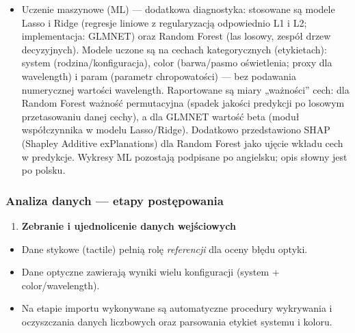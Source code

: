 \documentclass[
  10pt,
]{article}
\providecommand{\tightlist}{%
  \setlength{\itemsep}{0pt}\setlength{\parskip}{0pt}}
\begin{document}
\begin{itemize}
  nachylenie (p\textless0.05). \textbf{NIE} = nie ma żadnego systemu z
  istotnym nachyleniem (p\textless0.05) --- nawet jeśli miejscami
  widoczne są słabe „Trendy (p\textless0.1)''. Jest to wskaźnik
  przesiewowy (screening): „NIE'' nie dowodzi braku wpływu wavelength,
  tylko brak wykrytego trendu w danych; wskaźnik nie niesie też
  informacji o kierunku trendu (czy większa wavelength poprawia/pogarsza
  zgodność).
\item
  Uczenie maszynowe (ML) --- dodatkowa diagnostyka: stosowane są modele
  Lasso i Ridge (regresje liniowe z regularyzacją odpowiednio L1 i L2;
  implementacja: GLMNET) oraz Random Forest (las losowy, zespół drzew
  decyzyjnych). Modele uczone są na cechach kategorycznych (etykietach):
  system (rodzina/konfiguracja), color (barwa/pasmo oświetlenia; proxy
  dla wavelength) i param (parametr chropowatości) --- bez podawania
  numerycznej wartości wavelength. Raportowane są miary „ważności''
  cech: dla Random Forest ważność permutacyjna (spadek jakości
  predykcji po losowym przetasowaniu danej cechy), a dla GLMNET wartość
  \textbar beta\textbar{} (moduł współczynnika w modelu Lasso/Ridge).
  Dodatkowo przedstawiono SHAP (Shapley Additive exPlanations) dla
  Random Forest jako ujęcie wkładu cech w predykcje. Wykresy ML
  pozostają podpisane po angielsku; opis słowny jest po polsku.
\end{itemize}

\subsubsection{Analiza danych --- etapy
postępowania}\label{analiza-danych-etapy-postux119powania}

\begin{enumerate}
\def\labelenumi{\arabic{enumi}.}
\tightlist
\item
  \textbf{Zebranie i ujednolicenie danych wejściowych}
\end{enumerate}

\begin{itemize}
\tightlist
\item
  Dane stykowe (tactile) pełnią rolę \emph{referencji} dla oceny błędu
  optyki.
\item
  Dane optyczne zawierają wyniki wielu konfiguracji (system +
  color/wavelength).
\item
  Na etapie importu wykonywane są automatyczne procedury wykrywania i
  oczyszczania danych liczbowych oraz parsowania etykiet systemu i
  koloru.
\end{itemize}
\end{document}
